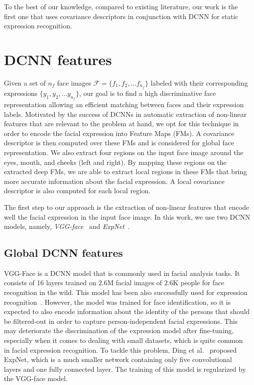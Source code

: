 \documentclass{bmvc2k}
\begin{document}
To the best of our knowledge, compared to existing literature, our work is the first one that uses covariance descriptors in conjunction with DCNN for static expression recognition. 
\section{DCNN features}\label{sect:approach}
Given a set of $n_f$ face images $\mathcal{F} = \{f_{1}, f_{2},...f_{n_f} \}$ labeled with their corresponding expressions $\{y_{1}, y_{2},...y_{n_f}\}$, our goal is to find a high discriminative face representation allowing an efficient matching between faces and their expression labels. Motivated by the success of DCNNs in automatic extraction of non-linear features that are relevant to the problem at hand, we opt for this technique in order to encode the facial expression into Feature Maps (FMs). A covariance descriptor is then computed over these FMs and is considered for global face representation. We also extract four regions on the input face image around the eyes, mouth, and cheeks (left and right). 
By mapping these regions on the extracted deep FMs, we are able to extract local regions in these FMs that bring more accurate information about the facial expression. A local covariance descriptor is also computed for each local region. 

The first step to our approach is the extraction of non-linear features that encode well the facial expression in the input face image. In this work, we use two DCNN models, namely, \textit{VGG-face}~\cite{parkhi2015deep} and \textit{ExpNet}~\cite{ding2017facenet2expnet}.

\subsection{Global DCNN features}\label{sect:GDCNN}
VGG-Face is a DCNN model that is commonly used in facial analysis tasks. It consists of 16 layers trained on $2.6$M facial images of $2.6$K people for face recognition in the wild. This model has been also successfully used for expression recognition~\cite{ding2017facenet2expnet}. However, the model was trained for face identification, so it is expected to also encode information about the identity of the persons that should be filtered-out in order to capture person-independent facial expressions. This may deteriorate the discrimination of the expression model after fine-tuning, especially when it comes to dealing with small datasets, which is quite common in facial expression recognition.
To tackle this problem, Ding et al.~\cite{ding2017facenet2expnet} proposed ExpNet, which is a much smaller network containing only five convolutional layers and one fully connected layer. The training of this model is regularized by the VGG-face model.
\end{document}
